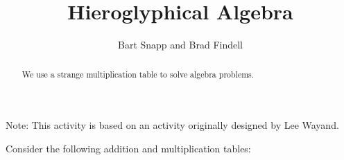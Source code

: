 \documentclass[nooutcomes]{ximera}
\title{Hieroglyphical Algebra}
\author{Bart Snapp and Brad Findell}
\begin{document}
\begin{abstract}
  We use a strange multiplication table to solve algebra problems.
\end{abstract}
\maketitle

\label{A:HAlgebra} 
Note: This activity is based on an activity originally designed by Lee Wayand.



Consider the following addition and multiplication tables:
\end{document}
